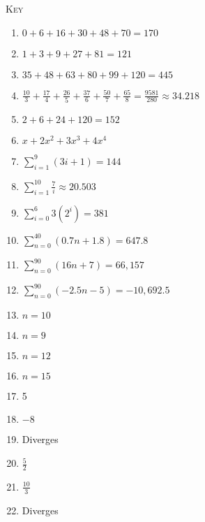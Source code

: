 \documentclass{article}
\begin{document}
\newpage

\textsc{Key}

\begin{enumerate}
    \setlength\itemsep{10pt}
    \item $0 + 6 + 16 + 30 + 48 + 70 = 170$
    \item $1 + 3 + 9 + 27 + 81 = 121$
    \item $35 + 48 + 63 + 80 + 99 + 120 = 445$
    \item $\frac{10}{3} + \frac{17}{4} + \frac{26}{5} + \frac{37}{6} + \frac{50}{7} + \frac{65}{8} = \frac{9581}{280} \approx 34.218$
    \item $2 + 6 + 24 + 120 = 152$
    \item $x + 2x^2 + 3x^3 + 4x^4$
    \item $\sum_{i=1}^{9}(3i+1) = 144$
    \item $\sum_{i=1}^{10}\frac{7}{i} \approx 20.503$
    \item $\sum_{i=0}^{6}3(2^i) = 381$
    \item $\sum_{n=0}^{40}\left(0.7n+1.8\right) = 647.8$
    \item $\sum_{n=0}^{90}\left(16n+7\right) = 66,157$
    \item $\sum_{n=0}^{90}\left(-2.5n-5\right) = -10,692.5$
    \item $n = 10$
    \item $n = 9$
    \item $n = 12$
    \item $n = 15$
    \item 5
    \item $-8$
    \item Diverges
    \item $\frac{5}{2}$
    \item $\frac{10}{3}$
    \item Diverges
\end{enumerate}
\end{document}
